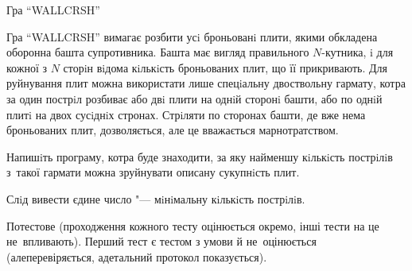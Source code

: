 \begin{problemAllDefault}{Гра ``WALLCRSH''}

Гра ``WALLCRSH'' 
вимагає
розбити усi броньованi плити,
якими
обкладена оборонна башта супротивника. Башта має вигляд 
правильного $N$-кутника, i для кожної з $N$ сторiн вiдома кiлькiсть 
броньованих плит, що її прикривають. Для руйнування плит можна використати 
лише спецiальну двоствольну гармату, котра за один пострiл розбиває або двi 
плити на однiй сторонi башти, або по однiй плитi на двох сусiднiх стронах.
Стрiляти по сторонах башти, де вже нема броньованих плит, дозволяється,
але це вважається марнотратством.

Напишiть програму, котра буде знаходити, за яку найменшу кiлькiсть
пострiлiв з~такої гармати можна зруйнувати описану сукупнiсть плит.




\pagebreak[3]

\OutputFile
Слiд вивести єдине число "--- мiнiмальну кiлькiсть пострiлiв.

\Scoring
Потестове (проходження кожного тесту оцінюється окремо, інші тести на це не~впливають). 
Перший тест є тестом з умови й не~оцінюється (але\nolinebreak[3] перевіряється, а\nolinebreak[3] детальний протокол показується). 

\end{problemAllDefault}